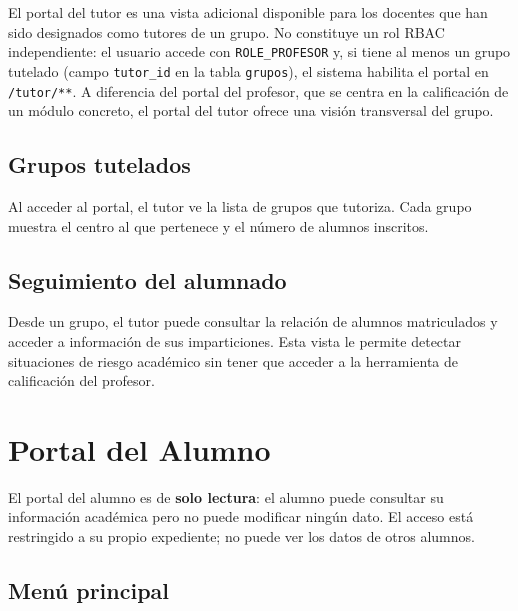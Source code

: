 \documentclass[12pt, a4paper]{report}
\begin{document}
El portal del tutor es una vista adicional disponible para los docentes que han sido
designados como tutores de un grupo. No constituye un rol RBAC independiente:
el usuario accede con \texttt{ROLE\_PROFESOR} y, si tiene al menos un grupo tutelado
(campo \texttt{tutor\_id} en la tabla \texttt{grupos}), el sistema habilita el
portal en \texttt{/tutor/**}. A diferencia del portal del profesor, que se centra
en la calificación de un módulo concreto, el portal del tutor ofrece una visión
transversal del grupo.

\subsection{Grupos tutelados}

Al acceder al portal, el tutor ve la lista de grupos que tutoriza. Cada grupo muestra el
centro al que pertenece y el número de alumnos inscritos.


\subsection{Seguimiento del alumnado}

Desde un grupo, el tutor puede consultar la relación de alumnos matriculados y acceder
a información de sus imparticiones. Esta vista le permite detectar situaciones de riesgo
académico sin tener que acceder a la herramienta de calificación del profesor.


\section{Portal del Alumno}

El portal del alumno es de \textbf{solo lectura}: el alumno puede consultar su
información académica pero no puede modificar ningún dato. El acceso está restringido
a su propio expediente; no puede ver los datos de otros alumnos.

\subsection{Menú principal}
\end{document}
